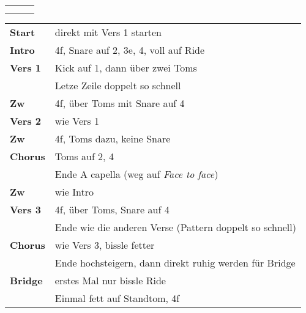 

\begin{tabular}{p{0.6cm}p{12cm}p{1.4cm}}
	\rowcolor{cyan} \myRow{\thesongnumber} & \myRow{Every Step} & \myRow{104} \\
	                                       &                    &             \\
\end{tabular}

\begin{tabular}{p{1.6cm}l}
	 \textbf{Start}  & direkt mit Vers 1 starten                                                       \\
	\textbf{Intro}  & 4f, Snare auf 2, 3e, 4, voll auf Ride                            \\
	\textbf{Vers 1} & Kick auf 1, dann über zwei Toms                                  \\
	                & Letze Zeile doppelt so schnell                                   \\
	\textbf{Zw}     & 4f, über Toms mit Snare auf 4                                    \\
	\textbf{Vers 2} & wie Vers 1                                                       \\
	\textbf{Zw}     & 4f, Toms dazu, keine Snare                                       \\
	\textbf{Chorus} & Toms auf 2, 4                                                    \\
	                & Ende A capella (weg auf \textit{Face to face})                   \\
	\textbf{Zw}     & wie Intro                                                        \\
	\textbf{Vers 3} & 4f, über Toms, Snare auf 4                                       \\
	                & Ende wie die anderen Verse (Pattern doppelt so schnell)          \\
	\textbf{Chorus} & wie Vers 3, bissle fetter                                        \\
	                & Ende hochsteigern, dann direkt ruhig werden für Bridge           \\
	\textbf{Bridge} & erstes Mal nur bissle Ride                                       \\
	                & Einmal fett auf Standtom, 4f                                     \\

\end{tabular}
